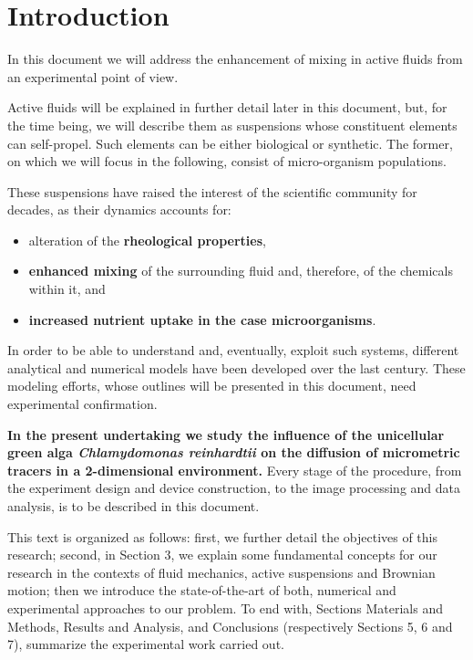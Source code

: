 \chapter{Introduction}
\label{introduction}

In this document we will address the enhancement of mixing in active fluids from an experimental point of view. 

Active fluids will be explained in further detail later in this document, but, for the time being, we will describe them as suspensions whose constituent elements can self-propel. Such elements can be either biological or synthetic. The former, on which we will focus in the following, consist of micro-organism populations.

These suspensions have raised the interest of the scientific community for decades, as their dynamics accounts for:

\begin{itemize}
	\item alteration of the \textbf{rheological properties},
	\item \textbf{enhanced mixing} of the surrounding fluid and, therefore, of the chemicals within it, and
	\item \textbf{increased nutrient uptake in the case microorganisms}.
\end{itemize}

In order to be able to understand and, eventually, exploit such systems, different analytical and numerical models have been developed over the last century. These modeling efforts, whose outlines will be presented in this document, need experimental confirmation.

\textbf{In the present undertaking we study the influence of the unicellular green alga \textit{Chlamydomonas reinhardtii} on the diffusion of micrometric tracers in a 2-dimensional environment.} 
Every stage of the procedure, from the experiment design and device construction, to the image processing and data analysis, is to be described in this document.

This text is organized as follows: first, we further detail the objectives of this research; second,  in Section 3, we explain some fundamental concepts for our research in the contexts of fluid mechanics, active suspensions and Brownian motion; then we introduce the state-of-the-art of both, numerical and experimental approaches to our problem.  To end with, Sections Materials and Methods, Results and Analysis, and Conclusions (respectively Sections 5, 6 and 7), summarize the experimental work carried out. 